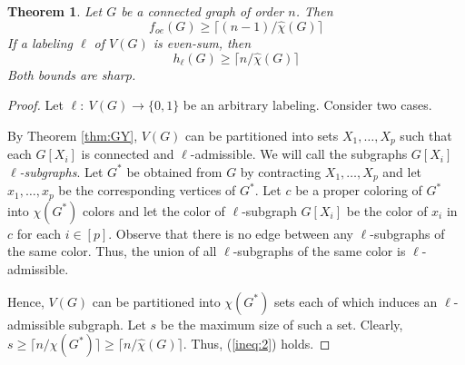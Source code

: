 \documentclass{article}
\newcommand{\mchi}{\hat{\chi}}
\newcommand{\tw}{{\rm tw}}
\newcommand{\2}{\vspace{0.2cm}}
\newtheorem{theorem}{Theorem}[section]
\begin{document}

\begin{theorem}\label{thm:tw}
Let $G$ be a connected graph of order $n$.
Then \begin{equation}\label{ineq:1} f_{oe}(G)\ge  \lceil (n-1)/\mchi(G) \rceil\end{equation}  
If a labeling $\ell$ of $V(G)$ is even-sum, then \begin{equation}\label{ineq:2}h_{\ell}(G)\ge  \lceil n/\mchi(G) \rceil\end{equation}
Both bounds are sharp.
\end{theorem} 
\begin{proof}
Let $\ell:\ V(G)\to\{0,1\}$ be an arbitrary labeling.  Consider two cases.

\2

 By Theorem \ref{thm:GY}, $V(G)$ can be partitioned into sets $X_1,\dots ,X_p$ such that each $G[X_i]$ is connected and $\ell$-admissible.  We will call the subgraphs $G[X_i]$ {\em $\ell$-subgraphs}. Let $G^*$ be obtained from $G$ by contracting $X_1,\dots ,X_p$ and let $x_1,\dots ,x_p$ be the corresponding vertices of $G^*.$ Let $c$ be a proper coloring of $G^*$ into $\chi(G^*)$ colors and 
let the color of $\ell$-subgraph $G[X_i]$ be the color of $x_i$ in $c$ for each $i\in [p].$ Observe that there is no edge between any $\ell$-subgraphs of the same color. 
Thus, the union of all $\ell$-subgraphs of the same color is $\ell$-admissible. 

Hence, $V(G)$ can be partitioned into $\chi(G^*)$ sets each of which induces an $\ell$-admissible subgraph. Let $s$ be the maximum size of such a set. Clearly, $s\ge \lceil n/\chi(G^*) \rceil\ge \lceil n/\mchi(G)\rceil.$ 
Thus, (\ref{ineq:2}) holds.

\2


\end{proof}
\end{document}
